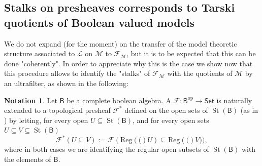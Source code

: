 \documentclass[11pt]{amsart}
\newcommand{\LL}{\mathcal{L}}
\newcommand{\F}{\mathcal{F}}
\theoremstyle{plain}
\theoremstyle{definition}
\newtheorem{notation}[theorem]{Notation}
\theoremstyle{plain}
\theoremstyle{remark}
\newcommand{\M}{\mathcal{M}}
\newcommand{\dSet}{\mathsf{Set}}
\DeclareMathOperator{\St}{St}
\newcommand{\bool}[1]{\mathsf{#1}}
\newcommand{\Reg}[1]{\mathrm{Reg}\left(#1\right)}
\newcommand{\0}{\mathsf{0}}
\renewcommand{\1}{\mathsf{1}}
\renewcommand{\2}{\mathsf{2}}
\theoremstyle{definition}
\begin{document}
\subsection{Stalks on presheaves corresponds to Tarski quotients of Boolean valued models}
We do not expand (for the moment) on the transfer of the model theoretic structure associated to $\LL$ on $\M$ to $\F_\M$, but it is to be expected that this can be done "coherently". In order to appreciate why this is the case we show now that this procedure allows to identify the "stalks" of $\F_\M$ with the quotients of $\M$ by an ultrafilter, as shown in the following: 

\begin{notation}\label{not:extRO(X)toO(X)}
Let $\bool{B}$ be a complete boolean algebra.
A  $\F:\bool{B}^{\mathrm{op}}\to\dSet$ is naturally extended to a topological presheaf $\F^*$ defined on the open sets of $\St(\bool{B})$ (as in \cite[Chapter II]{MacLMoer}) by letting, for every open $U\subseteq\St(\bool{B})$, 
and for every open sets $U\subseteq V\subseteq \St(\bool{B})$
\[\F^*(U\subseteq V):=\F(\Reg(U)\subseteq\Reg(V)),\] 
where in both cases we are identifying the regular open subsets of $\St(\bool{B})$ with the elements of $\bool{B}$.
\end{notation}
\end{document}
